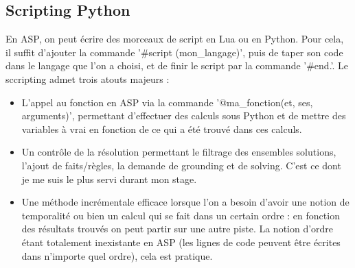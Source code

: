 \documentclass[12pt,a4paper]{article}
\begin{document}
\subsection{Scripting Python}
En ASP, on peut écrire des morceaux de script en Lua ou en Python. Pour cela, il suffit d'ajouter la commande '\#script (mon\_langage)', puis de taper son code dans le langage que l'on a choisi, et de finir le script par la 
commande '\#end.'. Le sccripting admet trois atouts majeurs :
\begin{itemize}
	\item L'appel au fonction en ASP via la commande '@ma\_fonction(et, ses, arguments)', permettant d'effectuer des calculs sous Python et de mettre des variables à vrai en fonction de ce qui a été trouvé dans ces 
	calculs.
	\item Un contrôle de la résolution permettant le filtrage des ensembles solutions, l'ajout de faits/règles, la demande de grounding et de solving. C'est ce dont je me suis le plus servi durant mon stage.
	\item Une méthode incrémentale efficace lorsque l'on a besoin d'avoir une notion de temporalité ou bien un calcul qui se fait dans un certain ordre : en fonction des résultats trouvés on peut partir sur une autre piste. La 
	notion d'ordre étant totalement inexistante en ASP (les lignes de code peuvent être écrites dans n'importe quel ordre), cela est pratique.
\end{itemize}
\end{document}
